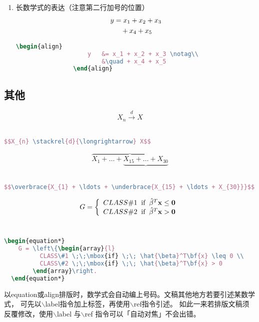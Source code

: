 \begin{enumerate}
    \item 长数学式的表达（注意第二行加号的位置）
        \begin{align}
            y   &= x_1 + x_2 + x_3 \notag\\
                &\quad + x_4 + x_5
        \end{align}
\begin{lstlisting}[language=TeX,numbers=none,frame=lrtb,keywords={begin}]
				\begin{align}
					y   &= x_1 + x_2 + x_3 \notag\\
						&\quad + x_4 + x_5
				\end{align}
\end{lstlisting}
\end{enumerate}


\subsection{其他}

  $$X_{n} \stackrel{d}{\longrightarrow} X$$\\
\begin{lstlisting}[language=TeX,numbers=none,frame=lrtb,keywords={begin}]
			$$X_{n} \stackrel{d}{\longrightarrow} X$$
\end{lstlisting}

  $$\overbrace{X_{1} + \ldots + \underbrace{X_{15} + \ldots + X_{30}}}$$\\
\begin{lstlisting}[language=TeX,numbers=none,frame=lrtb,keywords={begin}]
$$\overbrace{X_{1} + \ldots + \underbrace{X_{15} + \ldots + X_{30}}}$$
\end{lstlisting}

  \begin{equation*}
    G = \left\{\begin{array}{l}
          CLASS\#1 \;\;\mbox{if} \;\; \hat{\beta}^T\bf{x} \leq 0 \\
          CLASS\#2 \;\;\mbox{if} \;\; \hat{\beta}^T\bf{x} > 0
        \end{array}\right.
  \end{equation*}\\
\begin{lstlisting}[language=TeX,numbers=none,frame=lrtb,keywords={begin}]
  \begin{equation*}
    G = \left\{\begin{array}{l}
          CLASS\#1 \;\;\mbox{if} \;\; \hat{\beta}^T\bf{x} \leq 0 \\
          CLASS\#2 \;\;\mbox{if} \;\; \hat{\beta}^T\bf{x} > 0
        \end{array}\right.
  \end{equation*}
\end{lstlisting}

以equation或align排版时，数学式会自动编上号码。文稿其他地方若要引述某数学式，
可先以$\backslash$label指令加上标签，再使用$\backslash$ref指令引述。
如此一来若排版文稿须反覆修改，使用$\backslash$label 与$\backslash$ref 指令可以「自动对焦」不会出错。
